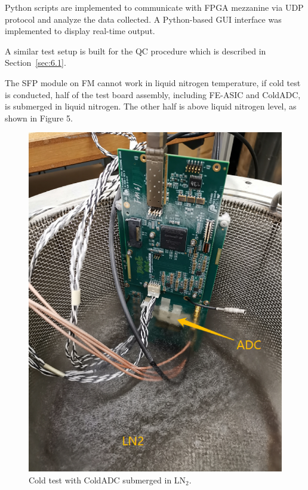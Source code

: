 Python scripts are implemented to communicate with FPGA mezzanine via UDP protocol and analyze the data collected. A Python-based GUI interface was implemented to display real-time output.

       A similar test setup is built for the QC procedure which is described in Section~\ref{sec:6.1}.

The SFP module on FM cannot work in liquid nitrogen temperature, if cold test is conducted, half of the test board assembly, including FE-ASIC and ColdADC, is submerged in liquid nitrogen. The other half is above liquid nitrogen level, as shown in Figure 5.    
\begin{figure}[!ht]
\centering
 \includegraphics[width=0.6\linewidth]{figures/BNL_coldtest.png}
  \caption{Cold test with ColdADC submerged in LN$_2$.}
  \label{fig:bnl_coldtest}
\end{figure}
